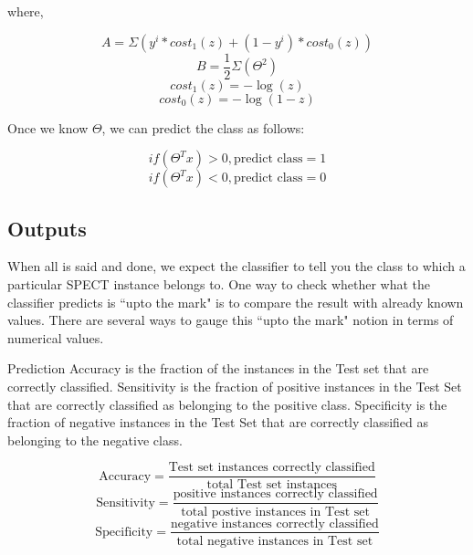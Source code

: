 \documentclass{acm_proc_article-sp}
\begin{document}
where,

\begin{equation}A = \Sigma(y^i * cost_{1}(z)  +  (1-y^i) * cost_{0}(z))\end{equation}    
\begin{equation}B = \frac{1}{2} \Sigma(\Theta^2)\end{equation}
\begin{equation}cost_{1}(z) = -\log(z)\end{equation}
\begin{equation}cost_{0}(z) = -\log(1 - z)\end{equation}

Once we know $\Theta$, we can predict the class as follows:

\begin{equation}if(\Theta^Tx) > 0, \text{predict class} = 1\end{equation}
\begin{equation}if(\Theta^Tx) < 0, \text{predict class} = 0\end{equation}

\subsection{Outputs}

When all is said and done, we expect the classifier to tell you the class to which a particular SPECT instance belongs to. One way to check whether what the classifier predicts is ``upto the mark" is to compare the result with already known values. There are several ways to gauge this ``upto the mark" notion in terms of numerical values.

Prediction Accuracy is the fraction of the instances in the Test set that are correctly classified. Sensitivity is the fraction of positive instances in the Test Set that are correctly classified as belonging to the positive class. Specificity is the fraction of negative instances in the Test Set that are correctly classified as belonging to the negative class.

\begin{equation}\text{Accuracy} = \frac{\text{Test set instances correctly classified}}{\text{total Test set instances}}\end{equation}
\begin{equation}\text{Sensitivity} = \frac{\text{positive instances correctly classified}}{\text{total postive instances in Test set}}\end{equation}
\begin{equation}\text{Specificity} = \frac{\text{negative instances correctly classified}}{\text{total negative instances in Test set}}\end{equation}
\end{document}

